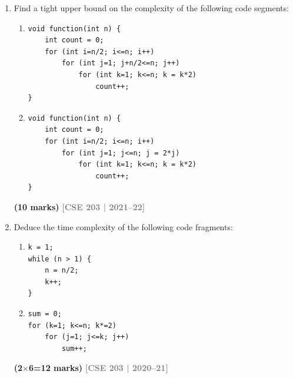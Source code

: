 \documentclass[12pt,a3paper]{article}
\newcommand{\yr}[1]{\hfill\textcolor{gray}{\small\textbf{[#1]}}}
\newcommand{\mk}[1]{\textcolor{orange!70!black}{\small\textbf{(#1 marks)}}}
\begin{document}
\begin{enumerate}
\begin{center}
\end{center}

\vspace{0.5cm}

\item Find a tight upper bound on the complexity of the following code segments:
\begin{enumerate}
  \item \begin{verbatim}
void function(int n) {
    int count = 0;
    for (int i=n/2; i<=n; i++)
        for (int j=1; j+n/2<=n; j++)
            for (int k=1; k<=n; k = k*2)
                count++;
}
\end{verbatim}
  \item \begin{verbatim}
void function(int n) {
    int count = 0;
    for (int i=n/2; i<=n; i++)
        for (int j=1; j<=n; j = 2*j)
            for (int k=1; k<=n; k = k*2)
                count++;
}
\end{verbatim}
\end{enumerate}
\mk{10}
\yr{CSE 203 | 2021--22}

\item Deduce the time complexity of the following code fragments:
\begin{enumerate}
  \item \begin{verbatim}
k = 1;
while (n > 1) {
    n = n/2;
    k++;
}
\end{verbatim}
  \item \begin{verbatim}
sum = 0;
for (k=1; k<=n; k*=2)
    for (j=1; j<=k; j++)
        sum++;
\end{verbatim}
\end{enumerate}
\mk{2$\times$6=12}
\yr{CSE 203 | 2020--21}


\end{enumerate}
\end{document}
